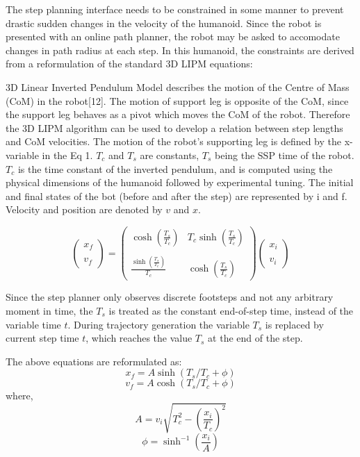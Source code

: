 \documentclass[letterpaper, 10 pt, conference]{ieeeconf}  %
\begin{document}
The step planning interface needs to be constrained in some manner to prevent drastic sudden changes in the velocity of the humanoid. Since the robot is presented with an online path planner, the robot may be asked to accomodate changes in path radius at each step.
In this humanoid, the constraints are derived from a reformulation of the standard 3D LIPM equations:

3D Linear Inverted Pendulum Model describes the motion of the Centre of Mass (CoM) in the robot[12]. The motion of support leg is opposite of the CoM, since the support leg behaves as a pivot which moves the CoM of the robot. Therefore the 3D LIPM algorithm can be used to develop a relation between step lengths and CoM velocities. The motion of the robot's supporting leg is defined by the x-variable in the Eq 1. $T_{c}$ and $T_{s}$ are constants, $T_{s}$ being the SSP time of the robot. $T_{c}$  is the time constant of the inverted pendulum, and is computed using the physical dimensions of the humanoid followed by experimental tuning. The initial and final states of the bot (before and after the step) are represented by i and f. Velocity and position are denoted by $v$ and $x$.


\begin{equation}
\left(\begin{array}{c}x_{f}\\\\ v_{f}\end{array}\right)=\left(\begin{array}{cc}\cosh\left(\frac{T_{s}}{T_{c}}\right) & T_{c}\sinh\left(\frac{T_{s}}{T_{c}}\right) \\\\ \frac{\sinh\left(\frac{T_{s}}{T_{c}}\right)}{T_{c}} & \cosh\left(\frac{T_{s}}{T_{c}}\right)\end{array}\right)\left(\begin{array}{c}x_{i}\\\\ v_{i}\end{array}\right)
\end{equation}

Since the step planner only observes discrete footsteps and not any arbitrary moment in time, the $T_{s}$ is treated as the constant end-of-step time, instead of the variable time $t$. During trajectory generation the variable $T_{s}$ is replaced by current step time $t$, which reaches the value $T_{s}$ at the end of the step.

The above equations are reformulated as:
\begin{equation}
x_{f} = A\sinh\left(T_{s}/T_{c} + \phi\right)
\end{equation}
\begin{equation}
v_{f} = A\cosh\left(T_{s}/T_{c} + \phi\right)
\end{equation}
where,
\begin{equation}
 A=v_{i}\sqrt{T_{c}^{2}-\left(\frac{x_{i}}{T_{c}}\right)^{2}}
  \end{equation}
  \begin{equation}
  \phi=\sinh^{-1}\left(\frac{x_{i}}{A}\right)
\end{equation}
\end{document}
